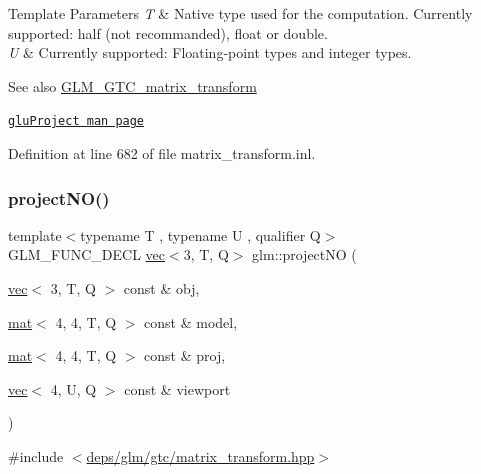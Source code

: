 \begin{DoxyTemplParams}{Template Parameters}
{\em T} & Native type used for the computation. Currently supported\+: half (not recommanded), float or double. \\
\hline
{\em U} & Currently supported\+: Floating-\/point types and integer types. \\
\hline
\end{DoxyTemplParams}
\begin{DoxySeeAlso}{See also}
\hyperlink{group__gtc__matrix__transform}{G\+L\+M\+\_\+\+G\+T\+C\+\_\+matrix\+\_\+transform} 

\href{https://www.khronos.org/registry/OpenGL-Refpages/gl2.1/xhtml/gluProject.xml}{\tt glu\+Project man page} 
\end{DoxySeeAlso}


Definition at line 682 of file matrix\+\_\+transform.\+inl.

\mbox{\label{group__gtc__matrix__transform_ga05249751f48d14cb282e4979802b8111}} 
\subsubsection{\texorpdfstring{project\+N\+O()}{projectNO()}}
{\footnotesize\ttfamily template$<$typename T , typename U , qualifier Q$>$ \\
G\+L\+M\+\_\+\+F\+U\+N\+C\+\_\+\+D\+E\+CL \hyperlink{structglm_1_1vec}{vec}$<$3, T, Q$>$ glm\+::project\+NO (\begin{DoxyParamCaption}\item[{\hyperlink{structglm_1_1vec}{vec}$<$ 3, T, Q $>$ const \&}]{obj,  }\item[{\hyperlink{structglm_1_1mat}{mat}$<$ 4, 4, T, Q $>$ const \&}]{model,  }\item[{\hyperlink{structglm_1_1mat}{mat}$<$ 4, 4, T, Q $>$ const \&}]{proj,  }\item[{\hyperlink{structglm_1_1vec}{vec}$<$ 4, U, Q $>$ const \&}]{viewport }\end{DoxyParamCaption})}



{\ttfamily \#include $<$\hyperlink{matrix__transform_8hpp}{deps/glm/gtc/matrix\+\_\+transform.\+hpp}$>$}

